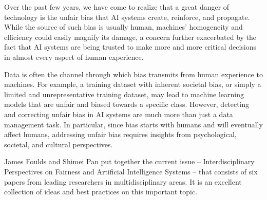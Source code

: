 \documentclass[11pt]{article}
\begin{document}
Over the past few years, we have come to realize that a great danger
of technology is the unfair bias that AI systems create, reinforce,
and propagate. While the source of such bias is usually human,
machines' homogeneity and efficiency could easily magnify its damage,
a concern further exacerbated by the fact that AI systems are being
trusted to make more and more critical decisions in almost every
aspect of human experience.

Data is often the channel through which bias transmits from human
experience to machines. For example, a training dataset with inherent
societal bias, or simply a limited and unrepresentative training
dataset, may lead to machine learning models that are unfair and
biased towards a specific class. However, detecting and correcting
unfair bias in AI systems are much more than just a data management
task. In particular, since bias starts with humans and will eventually
affect humans, addressing unfair bias requires insights from
psychological, societal, and cultural perspectives.

James Foulds and Shimei Pan put together the current issue --
Interdisciplinary Perspectives on Fairness and Artificial Intelligence
Systems -- that consists of six papers from leading researchers in
multidisciplinary areas. It is an excellent collection of ideas and
best practices on this important topic.
\end{document}
